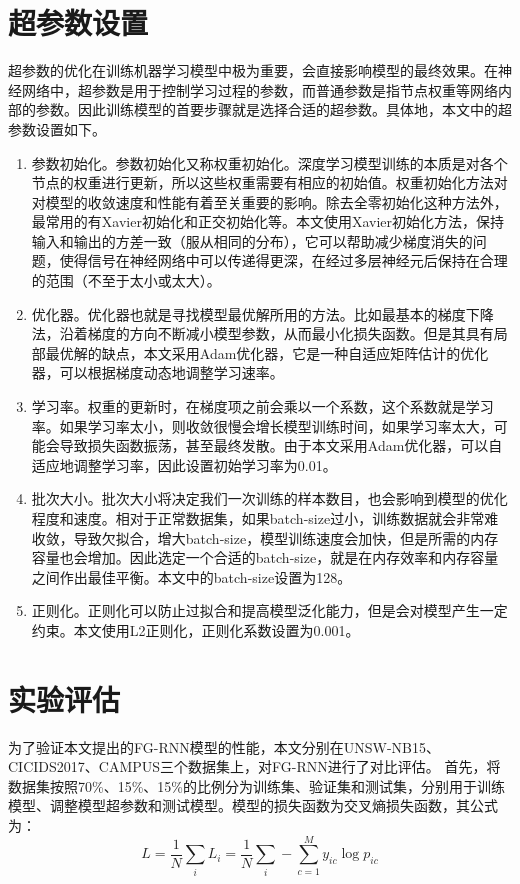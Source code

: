 \section{超参数设置}
超参数的优化在训练机器学习模型中极为重要，会直接影响模型的最终效果。在神经网络中，超参数是用于控制学习过程的参数，而普通参数是指节点权重等网络内部的参数。因此训练模型的首要步骤就是选择合适的超参数。具体地，本文中的超参数设置如下。
\begin{enumerate}
  \item 参数初始化。参数初始化又称权重初始化。深度学习模型训练的本质是对各个节点的权重进行更新，所以这些权重需要有相应的初始值。权重初始化方法对对模型的收敛速度和性能有着至关重要的影响。除去全零初始化这种方法外，最常用的有Xavier初始化\cite{glorot2010understanding}和正交初始化\cite{henaff2016recurrent}等。本文使用Xavier初始化方法，保持输入和输出的方差一致（服从相同的分布），它可以帮助减少梯度消失的问题，使得信号在神经网络中可以传递得更深，在经过多层神经元后保持在合理的范围（不至于太小或太大）。
  \item 优化器。优化器也就是寻找模型最优解所用的方法。比如最基本的梯度下降法，沿着梯度的方向不断减小模型参数，从而最小化损失函数。但是其具有局部最优解的缺点，本文采用Adam优化器，它是一种自适应矩阵估计的优化器，可以根据梯度动态地调整学习速率。
  \item 学习率。权重的更新时，在梯度项之前会乘以一个系数，这个系数就是学习率。如果学习率太小，则收敛很慢会增长模型训练时间，如果学习率太大，可能会导致损失函数振荡，甚至最终发散。由于本文采用Adam优化器，可以自适应地调整学习率，因此设置初始学习率为0.01。
  \item 批次大小。批次大小将决定我们一次训练的样本数目，也会影响到模型的优化程度和速度。相对于正常数据集，如果batch-size过小，训练数据就会非常难收敛，导致欠拟合，增大batch-size，模型训练速度会加快，但是所需的内存容量也会增加。因此选定一个合适的batch-size，就是在内存效率和内存容量之间作出最佳平衡。本文中的batch-size设置为128。
  \item 正则化。正则化可以防止过拟合和提高模型泛化能力，但是会对模型产生一定约束。本文使用L2正则化，正则化系数设置为0.001。
  
\end{enumerate}



\section{实验评估}
为了验证本文提出的FG-RNN模型的性能，本文分别在UNSW-NB15、CICIDS2017、CAMPUS三个数据集上，对FG-RNN进行了对比评估。
首先，将数据集按照70\%、15\%、15\%的比例分为训练集、验证集和测试集，分别用于训练模型、调整模型超参数和测试模型。模型的损失函数为交叉熵损失函数，其公式为：
\begin{equation}
  L = \frac{1}{N} \sum_i{L_i} = \frac{1}{N}\sum_i - \sum_{c=1}^{M}y_{ic}\log{p_{ic}}
\end{equation}


